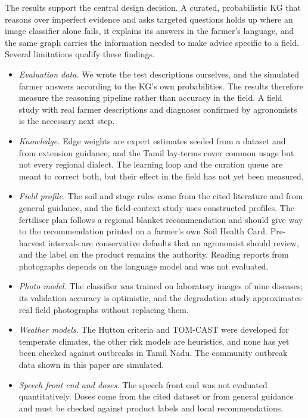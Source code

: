 \documentclass[conference]{IEEEtran}
\begin{document}
The results support the central design decision. A curated, probabilistic KG that reasons over imperfect evidence and asks targeted questions holds up where an image classifier alone fails, it explains its answers in the farmer's language, and the same graph carries the information needed to make advice specific to a field. Several limitations qualify these findings.
\begin{itemize}
  \item \emph{Evaluation data.} We wrote the test descriptions ourselves, and the simulated farmer answers according to the KG's own probabilities. The results therefore measure the reasoning pipeline rather than accuracy in the field. A field study with real farmer descriptions and diagnoses confirmed by agronomists is the necessary next step.
  \item \emph{Knowledge.} Edge weights are expert estimates seeded from a dataset and from extension guidance, and the Tamil lay-terms cover common usage but not every regional dialect. The learning loop and the curation queue are meant to correct both, but their effect in the field has not yet been measured.
  \item \emph{Field profile.} The soil and stage rules come from the cited literature and from general guidance, and the field-context study uses constructed profiles. The fertiliser plan follows a regional blanket recommendation and should give way to the recommendation printed on a farmer's own Soil Health Card. Pre-harvest intervals are conservative defaults that an agronomist should review, and the label on the product remains the authority. Reading reports from photographs depends on the language model and was not evaluated.
  \item \emph{Photo model.} The classifier was trained on laboratory images of nine diseases; its validation accuracy is optimistic, and the degradation study approximates real field photographs without replacing them.
  \item \emph{Weather models.} The Hutton criteria and TOM-CAST were developed for temperate climates, the other risk models are heuristics, and none has yet been checked against outbreaks in Tamil Nadu. The community outbreak data shown in this paper are simulated.
  \item \emph{Speech front end and doses.} The speech front end was not evaluated quantitatively. Doses come from the cited dataset or from general guidance and must be checked against product labels and local recommendations.
\end{itemize}
\end{document}
